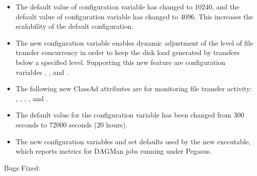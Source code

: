 \begin{itemize}

\item The default value of configuration variable
 has changed to 10240,
and the default value of configuration variable 
 has changed to 4096.
This increases the scalability of the default configuration.

\item The new configuration variable
 enables dynamic
adjustment of the level of file transfer concurrency in order to
keep the disk load generated by transfers below a specified level.
Supporting this new feature are configuration variables
,
, and
.

\item The following new  ClassAd attributes are for
monitoring file transfer activity:
,
,
,
, and
.

\item The default value for the configuration variable
 has been changed from 300 seconds to
72000 seconds (20 hours).

\item The new configuration variables
 and
set defaults used by the new  executable,
which reports metrics for DAGMan jobs running under Pegasus.
\end{itemize}

\noindent Bugs Fixed:

